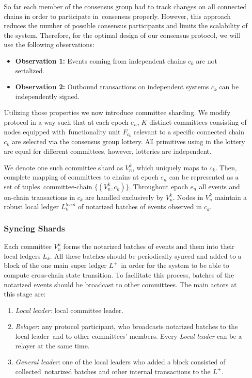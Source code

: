 So far each member of the consensus group had to track changes on all connected chains in order to participate in\
consensus properly.
However, this approach reduces the number of possible consensus participants and limits the scalability of the system.
Therefore, for the optimal design of our consensus protocol, we will use the following observations:
\begin{itemize}
    \item[]\textbf{Observation 1:} Events coming from independent chains $c_k$ are not serialized.
    \item[] \textbf{Observation 2:} Outbound transactions on independent systems $c_k$ can be independently signed.
\end{itemize}

Utilizing those properties we now introduce committee sharding.
We modify protocol in a way such that at each epoch $e_n$, $K$ distinct committees consisting of nodes equipped with\
functionality unit $F_{c_k}$ relevant to a specific connected chain $c_k$ are selected via the consensus group lottery.
All primitives using in the lottery are equal for different committees, however, lotteries are independent.

We denote one such committee shard as $V_{n}^k$, which uniquely maps to $c_k$.
Then, complete mapping of committees to chains at epoch $e_n$ can be represented as a set of tuples\
committee-chain $\{(V_{n}^k, c_k)\}$.
Throughout epoch $e_n$ all events and on-chain transactions in $c_k$ are handled exclusively by $V_{n}^k$.
Nodes in $V_{n}^k$ maintain a robust local ledger $L^{local}_k$ of notarized batches of events observed in $c_k$.

\subsubsection{Syncing Shards}

Each committee $V_n^k$ forms the notarized batches of events and them into their local ledgers $L_k$.
All these batches should be periodically synced and added to a block of the one main super ledger $L^+$\
in order for the system to be able to compute cross-chain state transition.
To facilitate this process, batches of the notarized events should be broadcast to other committees.
The main actors at this stage are:
\begin{enumerate}
    \item \emph{Local leader}: local committee leader.
    \item \emph{Relayer}: any protocol participant, who broadcasts notarized batches to the local leader\
    and to other committees' members.
    Every \emph{Local leader} can be a relayer at the same time.
    \item \emph{General leader}: one of the local leaders who added a block consisted of collected\
    notarized batches and other internal transactions to the $L^+$.
\end{enumerate}

